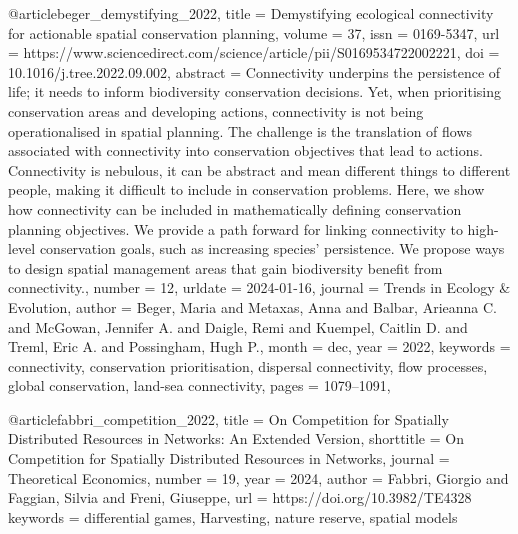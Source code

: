 {{{@article{beger_demystifying_2022,
	title = {Demystifying ecological connectivity for actionable spatial conservation planning},
	volume = {37},
	issn = {0169-5347},
	url = {https://www.sciencedirect.com/science/article/pii/S0169534722002221},
	doi = {10.1016/j.tree.2022.09.002},
	abstract = {Connectivity underpins the persistence of life; it needs to inform biodiversity conservation decisions. Yet, when prioritising conservation areas and developing actions, connectivity is not being operationalised in spatial planning. The challenge is the translation of flows associated with connectivity into conservation objectives that lead to actions. Connectivity is nebulous, it can be abstract and mean different things to different people, making it difficult to include in conservation problems. Here, we show how connectivity can be included in mathematically defining conservation planning objectives. We provide a path forward for linking connectivity to high-level conservation goals, such as increasing species’ persistence. We propose ways to design spatial management areas that gain biodiversity benefit from connectivity.},
	number = {12},
	urldate = {2024-01-16},
	journal = {Trends in Ecology \& Evolution},
	author = {Beger, Maria and Metaxas, Anna and Balbar, Arieanna C. and McGowan, Jennifer A. and Daigle, Remi and Kuempel, Caitlin D. and Treml, Eric A. and Possingham, Hugh P.},
	month = dec,
	year = {2022},
	keywords = {connectivity, conservation prioritisation, dispersal connectivity, flow processes, global conservation, land-sea connectivity},
	pages = {1079--1091},
}

@article{fabbri_competition_2022,
	title = {On {Competition} for {Spatially} {Distributed} {Resources} in {Networks}: {An} {Extended} {Version}},
	shorttitle = {On {Competition} for {Spatially} {Distributed} {Resources} in {Networks}},
	journal = {Theoretical Economics},
	number = {19},
	year = {2024},
	author = {Fabbri, Giorgio and Faggian, Silvia and Freni, Giuseppe},
	url = {https://doi.org/10.3982/TE4328}	
	keywords = {differential games, Harvesting, nature reserve, spatial models}}

}}}
